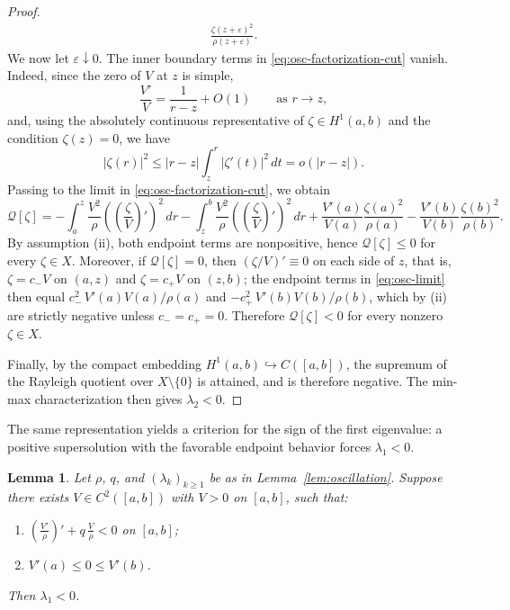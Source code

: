 \documentclass[11pt]{article}
\numberwithin{equation}{section}
\newtheorem{lemma}[theorem]{Lemma}
\theoremstyle{definition}
\begin{document}
\begin{proof}
\begin{align}
        \frac{\zeta(z+\varepsilon)^2}{\rho(z+\varepsilon)}.
    \label{eq:osc-factorization-cut}
\end{align}
We now let $\varepsilon\downarrow0$. The inner boundary terms in \eqref{eq:osc-factorization-cut} vanish. Indeed, since the zero of $V$ at $z$ is simple,
\[
    \frac{V'}{V}=\frac{1}{r-z}+O(1)
    \qquad\text{as }r\to z,
\]
and, using the absolutely continuous representative of $\zeta\in H^1(a,b)$ and the condition $\zeta(z)=0$, we have
\[
    |\zeta(r)|^2
    \leq |r-z|\int_z^r|\zeta'(t)|^2\,dt=o(|r-z|).
\]
Passing to the limit in \eqref{eq:osc-factorization-cut}, we obtain
\begin{equation}\label{eq:osc-limit}
    \mathcal Q[\zeta]
    =
    -\int_{a}^{z}\frac{V^2}{\rho}
        \left(\left(\frac{\zeta}{V}\right)'\right)^2\,dr
    -\int_{z}^{b}\frac{V^2}{\rho}
        \left(\left(\frac{\zeta}{V}\right)'\right)^2\,dr
    +\frac{V'(a)}{V(a)}\frac{\zeta(a)^2}{\rho(a)}
    -\frac{V'(b)}{V(b)}\frac{\zeta(b)^2}{\rho(b)}.
\end{equation}
By assumption (ii), both endpoint terms are nonpositive, hence $\mathcal{Q}[\zeta]\leq0$ for every $\zeta\in X$. Moreover, if $\mathcal{Q}[\zeta]=0$, then $(\zeta/V)'\equiv0$ on each side of $z$, that is, $\zeta=c_-V$ on $(a,z)$ and $\zeta=c_+V$ on $(z,b)$; the endpoint terms in \eqref{eq:osc-limit} then equal $c_-^2\,V'(a)V(a)/\rho(a)$ and $-c_+^2\,V'(b)V(b)/\rho(b)$, which by (ii) are strictly negative unless $c_-=c_+=0$. Therefore $\mathcal{Q}[\zeta]<0$ for every nonzero $\zeta\in X$.

Finally, by the compact embedding $H^1(a,b)\hookrightarrow C([a,b])$, the supremum of the Rayleigh quotient over $X\setminus\{0\}$ is attained, and is therefore negative. The min-max characterization then gives $\lambda_2<0$.
\end{proof}



The same representation yields a criterion for the sign of the first eigenvalue: a positive supersolution with the favorable endpoint behavior forces $\lambda_1<0$.

\begin{lemma}\label{lem:supersolution}
Let $\rho$, $q$, and $(\lambda_k)_{k\geq1}$ be as in Lemma~\ref{lem:oscillation}. Suppose there exists $V\in C^2([a,b])$ with $V>0$ on $[a,b]$, such that:
\begin{enumerate}[label=\textup{(\roman*)}]
	\item $\left(\frac{V'}{\rho}\right)' + q\,\frac{V}{\rho}<0$ on $[a,b]$;
	\item $V'(a)\leq0\leq V'(b)$.
\end{enumerate}
Then $\lambda_1<0$.
\end{lemma}
\end{document}
